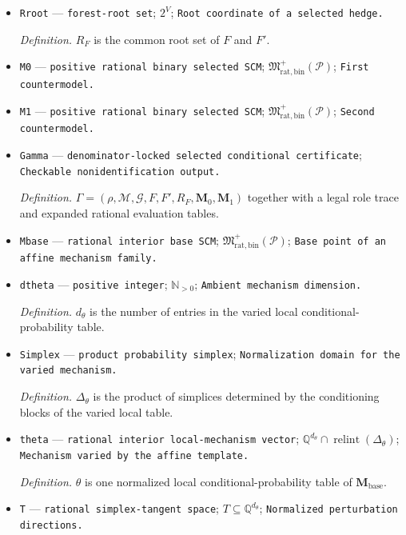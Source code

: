 \documentclass{article}
\begin{document}
\begin{itemize}
  \par\smallskip\noindent\emph{Definition.} \(F'\subsetneq F\).
  \item \texttt{Rroot} --- \texttt{forest-\allowbreak{}root set}; \(2^V\); \texttt{Root coordinate of a selected hedge.}
  \par\smallskip\noindent\emph{Definition.} \(R_F\) is the common root set of \(F\) and \(F'\).
  \item \texttt{M0} --- \texttt{positive rational binary selected SCM}; \(\mathfrak M_{\mathrm{rat,bin}}^+(\mathcal P)\); \texttt{First countermodel.}
  \item \texttt{M1} --- \texttt{positive rational binary selected SCM}; \(\mathfrak M_{\mathrm{rat,bin}}^+(\mathcal P)\); \texttt{Second countermodel.}
  \item \texttt{Gamma} --- \texttt{denominator-\allowbreak{}locked selected conditional certificate}; \texttt{Checkable nonidentification output.}
  \par\smallskip\noindent\emph{Definition.} \(\Gamma=(\rho,\mathcal M,\mathcal G,F,F',R_F,\mathbf M_0,\mathbf M_1)\) together with a legal role trace and expanded rational evaluation tables.
  \item \texttt{Mbase} --- \texttt{rational interior base SCM}; \(\mathfrak M_{\mathrm{rat,bin}}^+(\mathcal P)\); \texttt{Base point of an affine mechanism family.}
  \item \texttt{dtheta} --- \texttt{positive integer}; \(\mathbb N_{>0}\); \texttt{Ambient mechanism dimension.}
  \par\smallskip\noindent\emph{Definition.} \(d_{\theta}\) is the number of entries in the varied local conditional-probability table.
  \item \texttt{Simplex} --- \texttt{product probability simplex}; \texttt{Normalization domain for the varied mechanism.}
  \par\smallskip\noindent\emph{Definition.} \(\Delta_{\theta}\) is the product of simplices determined by the conditioning blocks of the varied local table.
  \item \texttt{theta} --- \texttt{rational interior local-\allowbreak{}mechanism vector}; \(\mathbb Q^{d_{\theta}}\cap\operatorname{relint}(\Delta_{\theta})\); \texttt{Mechanism varied by the affine template.}
  \par\smallskip\noindent\emph{Definition.} \(\theta\) is one normalized local conditional-probability table of \(\mathbf M_{\mathrm{base}}\).
  \item \texttt{T} --- \texttt{rational simplex-\allowbreak{}tangent space}; \(T\subseteq\mathbb Q^{d_{\theta}}\); \texttt{Normalized perturbation directions.}

\end{itemize}
\end{document}
